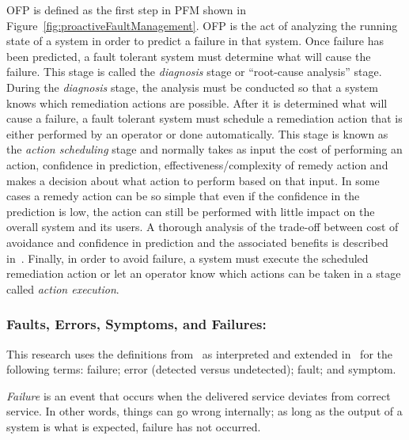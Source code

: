 \figproactiveFaultManagement

OFP is defined as the first step in PFM shown in
Figure~\ref{fig:proactiveFaultManagement}.  OFP is the act of analyzing the
running state of a system in order to predict a failure in that system. Once
failure has been predicted, a fault tolerant system must determine what will
cause the failure.  This stage is called the \emph{diagnosis} stage or
``root-cause analysis'' stage.  During the \emph{diagnosis} stage, the analysis
must be conducted so that a system knows which remediation actions are
possible.  After it is determined what will cause a failure, a fault tolerant
system must schedule a remediation action that is either performed by an
operator or done automatically.  This stage is known as the \emph{action
scheduling} stage and normally takes as input the cost of performing an action,
confidence in prediction, effectiveness/complexity of remedy action and makes a
decision about what action to perform based on that input.  In some cases a
remedy action can be so simple that even if the confidence in the prediction is
low, the action can still be performed with little impact on the overall system
and its users.  A thorough analysis of the trade-off between cost of avoidance
and confidence in prediction and the associated benefits is described
in~\cite{candea2004microreboot}.  Finally, in order to avoid failure, a system
must execute the scheduled remediation action or let an operator know which
actions can be taken in a stage called \emph{action execution}.

\subsubsection{Faults, Errors, Symptoms, and Failures:}
This research uses the definitions from~\cite{avivzienis2004basic} as
interpreted and extended in~\cite{salfnerSurvey} for the following terms:
failure; error (detected versus undetected); fault; and symptom.

\emph{Failure} is an event that occurs when the delivered service deviates from
correct service.  In other words, things can go wrong internally; as long as
the output of a system is what is expected, failure has not occurred.  

